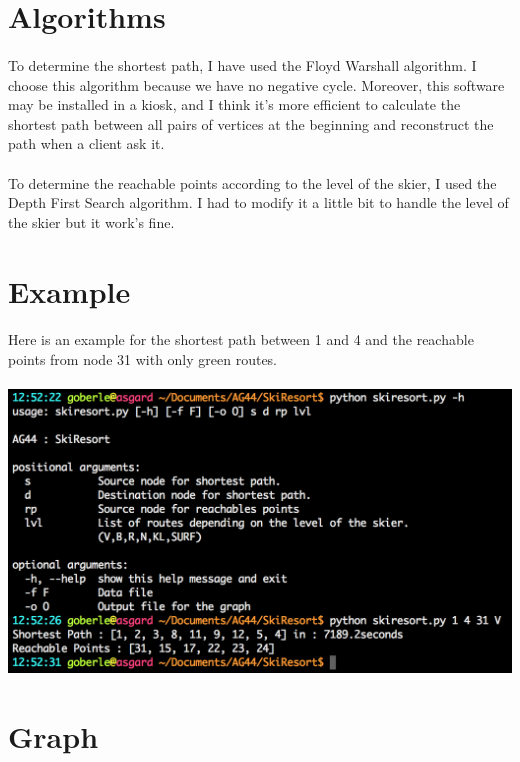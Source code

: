 \documentclass{article}
\begin{document}
\section{Algorithms}
    \paragraph{}
        To determine the shortest path, I have used the Floyd Warshall algorithm. I choose this algorithm because we have no negative cycle. Moreover, this software may be installed in a kiosk, and I think it's more efficient to calculate the shortest path between all pairs of vertices at the beginning and reconstruct the path when a client ask it.
    \paragraph{}
        To determine the reachable points according to the level of the skier, I used the Depth First Search algorithm. I had to modify it a little bit to handle the level of the skier but it work's fine. 
\newpage{}
\section{Example}
    \paragraph{}
        Here is an example for the shortest path between 1 and 4 and the reachable points from node 31 with only green routes.
    \paragraph{}
        \includegraphics[scale=0.60]{example.png}

\section{Graph}
\end{document}
